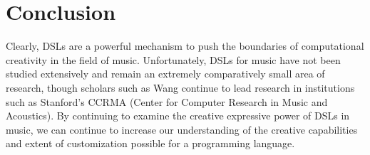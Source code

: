 \documentclass{report}
\begin{document}
\chapter{Conclusion}
Clearly, DSLs are a powerful mechanism to push the boundaries of  computational creativity in the field of music. Unfortunately, DSLs for music have not been studied extensively  and  remain an extremely comparatively small area of research, though scholars such as  Wang continue to lead  research in institutions such as Stanford's CCRMA (Center for Computer Research in Music and Acoustics). By continuing to examine the creative expressive power of DSLs  in  music, we can continue to increase our understanding of the creative capabilities and extent of customization possible for  a programming language.


\end{document}
